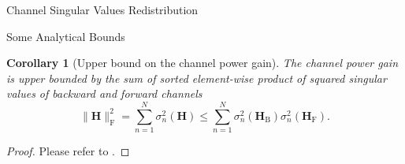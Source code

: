 \documentclass[journal]{IEEEtran}
\newtheorem{corollary}{Corollary}[proposition]
\begin{document}
\begin{section}{Channel Singular Values Redistribution}
\begin{subsection}{Some Analytical Bounds}

		\begin{corollary}[Upper bound on the channel power gain\label{co:sum_power}]
			The channel power gain is upper bounded by the sum of sorted element-wise product of squared singular values of backward and forward channels
			\begin{equation}
				\lVert \mathbf{H} \rVert _\mathrm{F}^2 = \sum_{n=1}^N \sigma_n^2(\mathbf{H}) \le \sum_{n=1}^N \sigma_n^2(\mathbf{H}_\mathrm{B}) \sigma_n^2(\mathbf{H}_\mathrm{F}).
				\label{iq:power_gain}
			\end{equation}
		\end{corollary}

		\begin{proof}
			Please refer to \cite[Inequality~24.4.7]{Hogben2013}.
		\end{proof}


\end{subsection}
\end{section}
\end{document}
